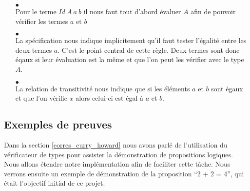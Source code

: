 \documentclass {article}
\newcommand{\codefrom}[3]
           {}
\theoremstyle{definition}
\theoremstyle{remark}
\begin{document}
\begin{itemize}
   
\item[$\bullet$] \\
  Pour le terme $Id\:A\:a\:b$ il nous faut tout d'abord évaluer $A$ afin de pouvoir 
  vérifier les termes $a$ et $b$
  \codefrom{dependent}{lambda}{check_head} 
  \codefrom{dependent}{lambda}{check_id}

\item[$\bullet$] \\

  La spécification nous indique implicitement qu'il faut tester l'égalité entre les deux termes $a$. 
  C'est le point central de cette règle.
  Deux termes sont donc éqaux si leur évaluation est la même et que l'on peut les vérifier 
  avec le type $A$.
  \codefrom{dependent}{lambda}{check_refl}
  
\item[$\bullet$] \\
  
  La relation de transitivité nous indique que si les éléments $a$ et $b$ sont égaux et que l'on vérifie $x$
  alors celui-ci est égal à $a$ et $b$.
  \codefrom{dependent}{lambda}{synth_head}
  \codefrom{dependent}{lambda}{synth_trans}
  
\end{itemize}


\subsection{Exemples de preuves}
\label{ex_preuves}

Dans la section \ref{corres_curry_howard} nous avons parlé de l'utilisation du vérificateur de types
pour assister la démonstration de propositions logiques. Nous allons étendre notre implémentation afin
de faciliter cette tâche.
Nous verrons ensuite un exemple de démonstration de la proposition 
``2 + 2 = 4'', qui était l'objectif initial de ce projet.
\end{document}
